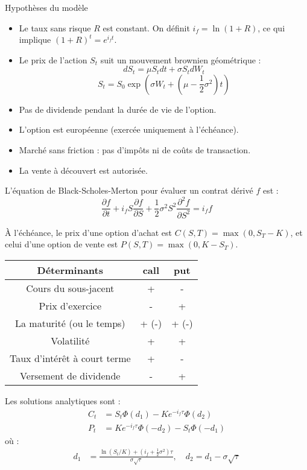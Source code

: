 \begin{f}
Hypothèses du modèle 
\begin{itemize}
	\item Le taux sans risque \(R\) est constant. On définit \(i_f = \ln(1+R)\), ce qui implique \((1+R)^t = e^{i_f t}\).
	\item Le prix de l'action \(S_t\) suit un mouvement brownien géométrique :
	\[
	dS_t = \mu S_t dt + \sigma S_t dW_t 
	\]
	\[
	 S_t = S_0 \exp\left(\sigma W_t + \left( \mu - \frac{1}{2}\sigma^2 \right)t \right)
	\]
	\item Pas de dividende pendant la durée de vie de l’option.
	\item L’option est \og{}européenne\fg{} (exercée uniquement à l’échéance).
	\item Marché sans friction : pas d’impôts ni de coûts de transaction.
	\item La vente à découvert est autorisée.
\end{itemize}

L’équation de Black-Scholes-Merton pour évaluer un contrat dérivé \(f\) est :
\[
\frac{\partial f}{\partial t} + i_f S \frac{\partial f}{\partial S} + \frac{1}{2}\sigma^2 S^2 \frac{\partial^2 f}{\partial S^2} = i_f f
\]

À l’échéance, le prix d’une option d’achat est \(C(S,T) = \max(0, S_T - K)\), et celui d’une option de vente est \(P(S,T) = \max(0, K - S_T)\).


\begin{center}
	\begin{tabular}{|c|c|c|}
		\hline
		Déterminants & \textbf{call}&\textbf{put}\\
		\hline
		Cours du sous-jacent	      & +&	-\\
		Prix d'exercice	              & -&	+\\
		La maturité	 (ou le temps)    & + (-)&	+ (-)\\
		Volatilité	              & +&	+\\
		Taux d'intérêt à court terme  & +&	-\\
		Versement de dividende	      & -&	+\\
		\hline
	\end{tabular}
\end{center}

Les solutions analytiques sont :
\begin{align*}
	C_t &= S_t \Phi(d_1) - Ke^{-i_f \tau} \Phi(d_2) \\
	P_t &= Ke^{-i_f \tau} \Phi(-d_2) - S_t \Phi(-d_1)
\end{align*}
où :
\begin{align*}
	d_1 &= \frac{\ln(S_t/K) + (i_f + \frac{1}{2}\sigma^2)\tau}{\sigma \sqrt{\tau}}, \quad
	d_2 = d_1 - \sigma \sqrt{\tau}
\end{align*}


\end{f}
